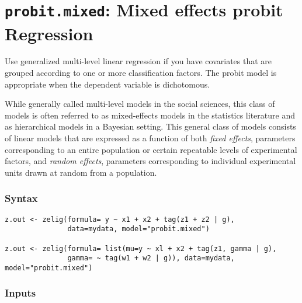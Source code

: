 \section{{\tt probit.mixed}: Mixed effects probit Regression}
\label{mixed}

Use generalized multi-level linear regression if you have covariates that are grouped according to one or more classification factors. The probit model is appropriate when the dependent variable is dichotomous.

While generally called multi-level models in the social sciences, this class of models is often referred to as mixed-effects models in the statistics literature and as hierarchical models in a Bayesian setting. This general class of models consists of linear models that are expressed as a function of both \emph{fixed effects}, parameters corresponding to an entire population or certain repeatable levels of experimental factors, and \emph{random effects}, parameters corresponding to individual experimental units drawn at random from a population.

\subsubsection{Syntax}

\begin{verbatim}
z.out <- zelig(formula= y ~ x1 + x2 + tag(z1 + z2 | g),
               data=mydata, model="probit.mixed")

z.out <- zelig(formula= list(mu=y ~ xl + x2 + tag(z1, gamma | g),
               gamma= ~ tag(w1 + w2 | g)), data=mydata, model="probit.mixed")
\end{verbatim}

\subsubsection{Inputs}

